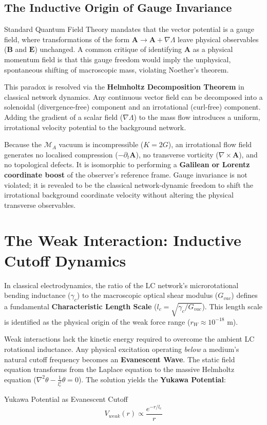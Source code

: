 \subsection{The Inductive Origin of Gauge Invariance}
Standard Quantum Field Theory mandates that the vector potential is a gauge field, where transformations of the form $\mathbf{A} \to \mathbf{A} + \nabla \Lambda$ leave physical observables ($\mathbf{B}$ and $\mathbf{E}$) unchanged. A common critique of identifying $\mathbf{A}$ as a physical momentum field is that this gauge freedom would imply the unphysical, spontaneous shifting of macroscopic mass, violating Noether's theorem.

This paradox is resolved via the \textbf{Helmholtz Decomposition Theorem} in classical network dynamics. Any continuous vector field can be decomposed into a solenoidal (divergence-free) component and an irrotational (curl-free) component. Adding the gradient of a scalar field ($\nabla \Lambda$) to the mass flow introduces a uniform, irrotational velocity potential to the background network.

Because the $\mathcal{M}_A$ vacuum is incompressible ($K = 2G$), an irrotational flow field generates no localised compression ($-\partial_t \mathbf{A}$), no transverse vorticity ($\nabla \times \mathbf{A}$), and no topological defects. It is isomorphic to performing a \textbf{Galilean or Lorentz coordinate boost} of the observer's reference frame. Gauge invariance is not violated; it is revealed to be the classical network-dynamic freedom to shift the irrotational background coordinate velocity without altering the physical transverse observables.

\section{The Weak Interaction: Inductive Cutoff Dynamics}
In classical electrodynamics, the ratio of the LC network's microrotational bending inductance ($\gamma_c$) to the macroscopic optical shear modulus ($G_{vac}$) defines a fundamental \textbf{Characteristic Length Scale} ($l_c = \sqrt{\gamma_c/G_{vac}}$). This length scale is identified as the physical origin of the weak force range ($r_W \approx 10^{-18}$ m).

Weak interactions lack the kinetic energy required to overcome the ambient LC rotational inductance. Any physical excitation operating \textit{below} a medium's natural cutoff frequency becomes an \textbf{Evanescent Wave}. The static field equation transforms from the Laplace equation to the massive Helmholtz equation ($\nabla^2 \theta - \frac{1}{l_c^2}\theta = 0$). The solution yields the \textbf{Yukawa Potential}:
\begin{resultbox}{Yukawa Potential as Evanescent Cutoff}
\begin{equation}
    V_{weak}(r) \propto \frac{e^{-r/l_c}}{r}
\end{equation}
\end{resultbox}

